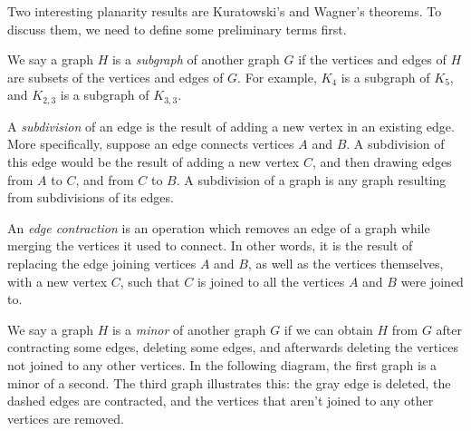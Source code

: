 \documentclass[11pt,paper=letter]{scrartcl}
\begin{document}
Two interesting planarity results are Kuratowski's and Wagner's theorems. To discuss them, we need to define some preliminary terms first.

We say a graph $H$ is a \emph{subgraph} of another graph $G$ if the vertices and edges of $H$ are subsets of the vertices and edges of $G$. For example, $K_4$ is a subgraph of $K_5$, and $K_{2,3}$ is a subgraph of $K_{3,3}$.

A \emph{subdivision} of an edge is the result of adding a new vertex in an existing edge. More specifically, suppose an edge connects vertices $A$ and $B$. A subdivision of this edge would be the result of adding a new vertex $C$, and then drawing edges from $A$ to $C$, and from $C$ to $B$. A subdivision of a graph is any graph resulting from subdivisions of its edges.

\begin{center}
\end{center}

An \emph{edge contraction} is an operation which removes an edge of a graph while merging the vertices it used to connect. In other words, it is the result of replacing the edge joining vertices $A$ and $B$, as well as the vertices themselves, with a new vertex $C$, such that $C$ is joined to all the vertices $A$ and $B$ were joined to.

We say a graph $H$ is a \emph{minor} of another graph $G$ if we can obtain $H$ from $G$ after contracting some edges, deleting some edges, and afterwards deleting the vertices not joined to any other vertices. In the following diagram, the first graph is a minor of a second. The third graph illustrates this: the gray edge is deleted, the dashed edges are contracted, and the vertices that aren't joined to any other vertices are removed.

\begin{center}
\end{center}
\begin{center}
\end{center}
\end{document}
